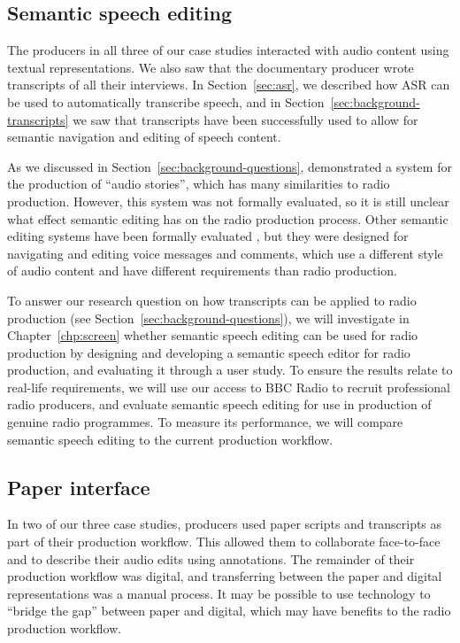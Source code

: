 \subsection{Semantic speech editing}

The producers in all three of our case studies interacted with audio content using textual representations. We also saw
that the documentary producer wrote transcripts of all their interviews.  In Section~\ref{sec:asr}, we described how
ASR can be used to automatically transcribe speech, and in Section~\ref{sec:background-transcripts} we saw that
transcripts have been successfully used to allow for semantic navigation and editing of speech content.

As we discussed in Section~\ref{sec:background-questions}, \citet{Rubin2013} demonstrated a system for the production
of ``audio stories'', which has many similarities to radio production.  However, this system was not formally
evaluated, so it is still unclear what effect semantic editing has on the radio production process. Other semantic
editing systems have been formally evaluated \citep{Whittaker2004,Yoon2014,Sivaraman2016}, but they were designed for
navigating and editing voice messages and comments, which use a different style of audio content and have different
requirements than radio production.

To answer our research question on how transcripts can be applied to radio production (see
Section~\ref{sec:background-questions}), we will investigate in Chapter~\ref{chp:screen} whether semantic speech
editing can be used for radio production by designing and developing a semantic speech editor for radio production, and
evaluating it through a user study.  To ensure the results relate to real-life requirements, we will use our access to
BBC Radio to recruit professional radio producers, and evaluate semantic speech editing for use in production of
genuine radio programmes.  To measure its performance, we will compare semantic speech editing to the current
production workflow.

\subsection{Paper interface}

In two of our three case studies, producers used paper scripts and transcripts as part of their production workflow.
This allowed them to collaborate face-to-face and to describe their audio edits using annotations. The remainder of
their production workflow was digital, and transferring between the paper and digital representations was a manual
process.  It may be possible to use technology to ``bridge the gap'' between paper and digital, which may have benefits
to the radio production workflow.

